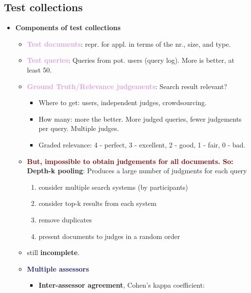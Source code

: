 \subsection{Test collections}
\begin{itemize}
    \item \textbf{Components of test collections}
    \begin{itemize}
        \item \textbf{\textcolor{Plum}{Test documents}}: repr. for appl. in terms of the nr., size, and type.
        \item \textbf{\textcolor{Plum}{Test queries}}: Queries from pot. users (query log). More is better, at least 50.
        \item \textbf{\textcolor{Plum}{Ground Truth/Relevance judgements}}: Search result relevant?
        \begin{itemize}
            \item \textcolor{Mulberry}{Where to get}: users, independent judges, crowdsourcing.
            \item \textcolor{Mulberry}{How many}: more the better. More judged queries, fewer judgements per query. Multiple judges.
            \item \textcolor{Mulberry}{Graded relevance}: 4 - perfect, 3 - excellent, 2 - good, 1 - fair,  0 - bad.
        \end{itemize}
        \item \textbf{\textcolor{Maroon}{But, impossible to obtain judgements for all documents. So:}} \\
        \textbf{\textcolor{PineGreen}{Depth-k pooling}}: Produces a large number of judgments for each query
        \begin{enumerate}
            \item consider multiple search systems (by participants)
            \item consider top-k results from each system
            \item remove duplicates
            \item present documents to judges in a random order
        \end{enumerate}
        \item still \textbf{\textcolor{PineGreen}{incomplete}}.
        \item \textbf{\textcolor{MidnightBlue}{Multiple assessors}}
        \begin{itemize}
            \item \textbf{Inter-assessor agreement}, Cohen's kappa coefficient: \\

\end{itemize}
\end{itemize}
\end{itemize}
